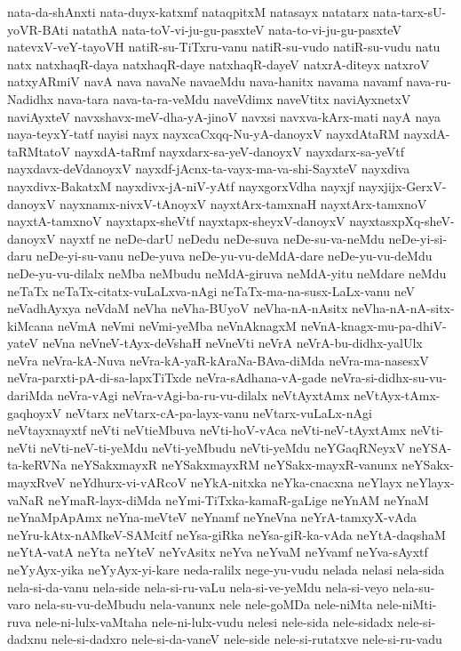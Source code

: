{nata-da-shAnxti
nata-duyx-katxmf
nataqpitxM
natasayx
natatarx
nata-tarx-sU-yoVR-BAti
natathA
nata-toV-vi-ju-gu-pasxteV
nata-to-vi-ju-gu-pasxteV
natevxV-veY-tayoVH
natiR-su-TiTxru-vanu
natiR-su-vudo
natiR-su-vudu
natu
natx
natxhaqR-daya
natxhaqR-daye
natxhaqR-dayeV
natxrA-diteyx
natxroV
natxyARmiV
navA
nava
navaNe
navaeMdu
nava-hanitx
navama
navamf
nava-ru-Nadidhx
nava-tara
nava-ta-ra-veMdu
naveVdimx
naveVtitx
naviAyxnetxV
naviAyxteV
navxshavx-meV-dha-yA-jinoV
navxsi
navxva-kArx-mati
nayA
naya
naya-teyxY-tatf
nayisi
nayx
nayxcaCxqq-Nu-yA-danoyxV
nayxdAtaRM
nayxdA-taRMtatoV
nayxdA-taRmf
nayxdarx-sa-yeV-danoyxV
nayxdarx-sa-yeVtf
nayxdavx-deVdanoyxV
nayxdf-jAcnx-ta-vayx-ma-va-shi-SayxteV
nayxdiva
nayxdivx-BakatxM
nayxdivx-jA-niV-yAtf
nayxgorxVdha
nayxjf
nayxjijx-GerxV-danoyxV
nayxnamx-nivxV-tAnoyxV
nayxtArx-tamxnaH
nayxtArx-tamxnoV
nayxtA-tamxnoV
nayxtapx-sheVtf
nayxtapx-sheyxV-danoyxV
nayxtasxpXq-sheV-danoyxV
nayxtf
ne
neDe-darU
neDedu
neDe-suva
neDe-su-va-neMdu
neDe-yi-si-daru
neDe-yi-su-vanu
neDe-yuva
neDe-yu-vu-deMdA-dare
neDe-yu-vu-deMdu
neDe-yu-vu-dilalx
neMba
neMbudu
neMdA-giruva
neMdA-yitu
neMdare
neMdu
neTaTx
neTaTx-citatx-vuLaLxva-nAgi
neTaTx-ma-na-susx-LaLx-vanu
neV
neVadhAyxya
neVdaM
neVha
neVha-BUyoV
neVha-nA-nAsitx
neVha-nA-nA-sitx-kiMcana
neVmA
neVmi
neVmi-yeMba
neVnAknagxM
neVnA-knagx-mu-pa-dhiV-yateV
neVna
neVneV-tAyx-deVshaH
neVneVti
neVrA
neVrA-bu-didhx-yalUlx
neVra
neVra-kA-Nuva
neVra-kA-yaR-kAraNa-BAva-diMda
neVra-ma-nasesxV
neVra-parxti-pA-di-sa-lapxTiTxde
neVra-sAdhana-vA-gade
neVra-si-didhx-su-vu-dariMda
neVra-vAgi
neVra-vAgi-ba-ru-vu-dilalx
neVtAyxtAmx
neVtAyx-tAmx-gaqhoyxV
neVtarx
neVtarx-cA-pa-layx-vanu
neVtarx-vuLaLx-nAgi
neVtayxnayxtf
neVti
neVtieMbuva
neVti-hoV-vAca
neVti-neV-tAyxtAmx
neVti-neVti
neVti-neV-ti-yeMdu
neVti-yeMbudu
neVti-yeMdu
neYGaqRNeyxV
neYSA-ta-keRVNa
neYSakxmayxR
neYSakxmayxRM
neYSakx-mayxR-vanunx
neYSakx-mayxRveV
neYdhurx-vi-vARcoV
neYkA-nitxka
neYka-cnacxna
neYlayx
neYlayx-vaNaR
neYmaR-layx-diMda
neYmi-TiTxka-kamaR-gaLige
neYnAM
neYnaM
neYnaMpApAmx
neYna-meVteV
neYnamf
neYneVna
neYrA-tamxyX-vAda
neYru-kAtx-nAMkeV-SAMcitf
neYsa-giRka
neYsa-giR-ka-vAda
neYtA-daqshaM
neYtA-vatA
neYta
neYteV
neYvAsitx
neYva
neYvaM
neYvamf
neYva-sAyxtf
neYyAyx-yika
neYyAyx-yi-kare
neda-ralilx
nege-yu-vudu
nelada
nelasi
nela-sida
nela-si-da-vanu
nela-side
nela-si-ru-vaLu
nela-si-ve-yeMdu
nela-si-veyo
nela-su-varo
nela-su-vu-deMbudu
nela-vanunx
nele
nele-goMDa
nele-niMta
nele-niMti-ruva
nele-ni-lulx-vaMtaha
nele-ni-lulx-vudu
nelesi
nele-sida
nele-sidadx
nele-si-dadxnu
nele-si-dadxro
nele-si-da-vaneV
nele-side
nele-si-rutatxve
nele-si-ru-vadu
}
